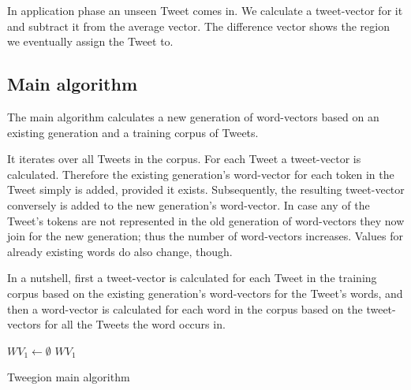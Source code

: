 \documentclass[./Main.tex]{subfiles}
\begin{document}
In application phase an unseen Tweet comes in. We calculate a tweet-vector for it and subtract it from the average vector. The difference vector shows the region we eventually assign the Tweet to.

\subsection{Main algorithm}
The main algorithm calculates a new generation of word-vectors based on an existing generation and a training corpus of Tweets.

It iterates over all Tweets in the corpus. For each Tweet a tweet-vector is calculated. Therefore the existing generation's word-vector for each token in the Tweet simply is added, provided it exists. Subsequently, the resulting tweet-vector conversely is added to the new generation's word-vector. In case any of the Tweet's tokens are not represented in the old generation of word-vectors they now join for the new generation; thus the number of word-vectors increases. Values for already existing words do also change, though.

In a nutshell, first a tweet-vector is calculated for each Tweet in the training corpus based on the existing generation's word-vectors for the Tweet's words, and then a word-vector is calculated for each word in the corpus based on the tweet-vectors for all the Tweets the word occurs in.\\

\begin{algorithm}[H]
 \SetAlgoLined\DontPrintSemicolon
 $WV_1 \gets\emptyset $\;
 \Return $WV_1$\;
 \caption{Tweegion main algorithm}
\end{algorithm}
\end{document}
